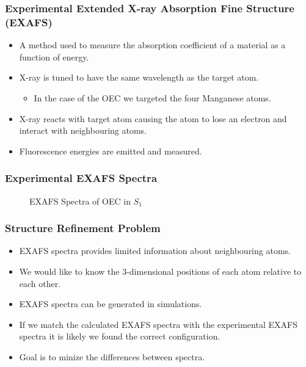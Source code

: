 \documentclass[10pt]{beamer}
\begin{document}
\begin{frame}
	\frametitle{Experimental Extended X-ray Absorption Fine Structure (EXAFS)}
	
	\begin{itemize}
		\item A method used to measure the absorption coefficient of a material as a function of energy.
		\item X-ray is tuned to have the same wavelength as the target atom.
			\begin{itemize}
				\item In the case of the OEC we targeted the four Manganese atoms.
			\end{itemize}
		\item X-ray reacts with target atom causing the atom to lose an electron and interact with neighbouring atoms.
		\item Fluorescence energies are emitted and measured.
	\end{itemize}

\end{frame}

\begin{frame}
	\frametitle{Experimental EXAFS Spectra}

	\begin{figure}
		\caption{EXAFS Spectra of OEC in $S_{1}$}
	\end{figure}

\end{frame}

\begin{frame}
	\frametitle{Structure Refinement Problem}

	\begin{itemize}
		\item EXAFS spectra provides limited information about neighbouring atoms.
		\item We would like to know the 3-dimensional positions of each atom relative to each other.
		\item EXAFS spectra can be generated in simulations.
		\item If we match the calculated EXAFS spectra with the experimental EXAFS spectra it is likely we found the correct configuration.
		\item Goal is to minize the differences between spectra.
	\end{itemize}

\end{frame}
\end{document}
